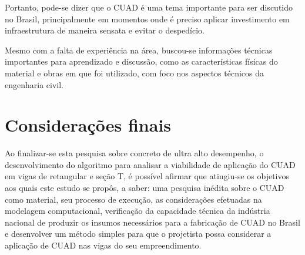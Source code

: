 \documentclass[
	12pt,				%
	openright,			%
	oneside,			%
	a4paper,			%
	chapter=TITLE,		%
	english,			%
	french,				%
	spanish,			%
	brazil				%
	]{abntex2}
\begin{document}
Portanto, pode-se dizer que o CUAD é uma tema importante para ser discutido no Brasil, principalmente em momentos onde é preciso aplicar investimento em infraestrutura de maneira sensata e evitar o despedício.

Mesmo com a falta de experiência na área, buscou-se informações técnicas importantes para aprendizado e discussão, como as características físicas do material e obras em que foi utilizado, com foco nos aspectos técnicos da engenharia civil.









%


\chapter{Considerações finais}

Ao finalizar-se esta pesquisa sobre concreto de ultra alto desempenho, o desenvolvimento do algoritmo para analisar a viabilidade de aplicação do CUAD em vigas de retangular e seção T, é possível afirmar que atingiu-se os objetivos aos quais este estudo se propôs, a saber: uma pesquisa inédita sobre o CUAD como material, seu processo de execução, as considerações efetuadas na modelagem computacional, verificação da capacidade técnica da indústria nacional de produzir os insumos necessários para a fabricação de CUAD no Brasil e desenvolver um método simples para que o projetista possa considerar a aplicação de CUAD nas vigas do seu empreendimento.
\end{document}
